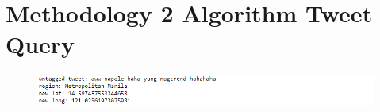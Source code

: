 \chapter{Methodology 2 Algorithm Tweet Query}

\begin{figure}[hbt!]
    \includegraphics[width=\textwidth, height=\textheight,keepaspectratio]{Method2Query.PNG}
\end{figure}